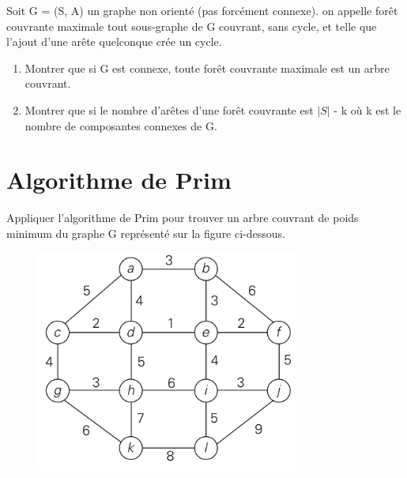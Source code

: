 \documentclass{article}[12pt]
\begin{document}
Soit G = (S, A) un graphe non orienté (pas forcément connexe). on appelle forêt couvrante maximale tout sous-graphe de G couvrant, sans cycle, et telle que l'ajout d'une arête quelconque crée un cycle.

\begin{enumerate}
    \item Montrer que si G est connexe, toute forêt couvrante maximale est un arbre couvrant.
    \item Montrer que si le nombre d'arêtes d'une forêt couvrante est $|S|$ - k où k est le nombre de composantes connexes de G.
\end{enumerate}

\section*{Algorithme de Prim}

Appliquer l'algorithme de Prim pour trouver un arbre couvrant de poids minimum du graphe G représenté sur la figure ci-dessous.

\begin{figure}[h!]
    \centering
    \includegraphics[scale=0.8]{Prim-1.png}
    \label{fig:my_label}
\end{figure}
\end{document}
